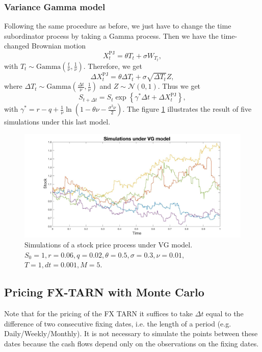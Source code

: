 \subsubsection{Variance Gamma model}
Following the same procedure as before, we just have to change the time subordinator process by taking a Gamma process. Then we have the time-changed Brownian motion
$$X_t^\text{PJ}=\theta T_t + \sigma W_{T_t},$$
with $T_t\sim \text{Gamma}\left(\frac{t}{\nu},\frac{1}{\nu} \right)$. Therefore, we get
$$\Delta X_t^\text{PJ} = \theta \Delta T_t + \sigma \sqrt{\Delta T_t} Z,$$
where $\Delta T_t\sim\text{Gamma}\left(\frac{\Delta t}{\nu},\frac{1}{\nu}\right)$ and $Z\sim\mathcal{N}(0,1)$.
Thus we get
$$S_{t+\Delta t} = S_t \exp\left\{\gamma^\ast\Delta t + \Delta X_t^\text{PJ}\right\},$$
with $\gamma^\ast = r-q + \frac{1}{\nu}\ln\left(1-\theta\nu-\frac{\sigma^2\nu}{2}\right)$.
The figure \ref{fig:MC:VG} illustrates the result of five simulations under this last model.
\begin{figure}[!htb]
	\includegraphics[width=\textwidth]{gfx/VG_plot}
	\caption{Simulations of a stock price process under VG model.\\ $S_0=1, r= 0.06,q = 0.02,\theta = 0.5 , \sigma = 0.3, \nu = 0.01,$\\$T = 1, dt = 0.001, M=5$.}
	\label{fig:MC:VG}
\end{figure}

\subsection{Pricing FX-TARN with Monte Carlo}
Note that for the pricing of the FX TARN it suffices to take $\Delta t$ equal to the difference of two consecutive fixing dates, i.e. the length of a period (e.g. Daily/Weekly/Monthly). It is not necessary to simulate the points between these dates because the cash flows depend only on the observations on the fixing dates.

